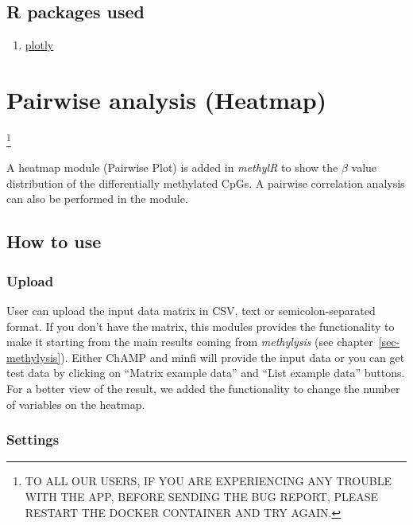 \documentclass[
  a4paper,
  oneside,
  open=any]{scrreport}
\providecommand{\tightlist}{%
  \setlength{\itemsep}{0pt}\setlength{\parskip}{0pt}}\usepackage{longtable,booktabs,array}
\begin{document}
\hypertarget{r-packages-used-1}{%
\section{R packages used}\label{r-packages-used-1}}

\begin{enumerate}
\def\labelenumi{\arabic{enumi}.}
\tightlist
\item
  \href{https://cran.r-project.org/web/packages/plotly/plotly.pdf}{plotly}
\end{enumerate}

\hypertarget{sec-pairwise}{%
\chapter{Pairwise analysis (Heatmap)}\label{sec-pairwise}}

\footnote{TO ALL OUR USERS, IF YOU ARE EXPERIENCING ANY TROUBLE WITH THE
  APP, BEFORE SENDING THE BUG REPORT, PLEASE RESTART THE DOCKER
  CONTAINER AND TRY AGAIN.}

A heatmap module (Pairwise Plot) is added in \emph{methylR} to show the
\(\beta\) value distribution of the differentially methylated CpGs. A
pairwise correlation analysis can also be performed in the module.

\hypertarget{how-to-use-4}{%
\section{How to use}\label{how-to-use-4}}

\hypertarget{upload}{%
\subsection{Upload}\label{upload}}

User can upload the input data matrix in CSV, text or
semicolon-separated format. If you don't have the matrix, this modules
provides the functionality to make it starting from the main results
coming from \emph{methylysis} (see chapter~\ref{sec-methylysis}). Either
ChAMP and minfi will provide the input data or you can get test data by
clicking on ``Matrix example data'' and ``List example data'' buttons.
For a better view of the result, we added the functionality to change
the number of variables on the heatmap.

\hypertarget{settings}{%
\subsection{Settings}\label{settings}}
\end{document}
